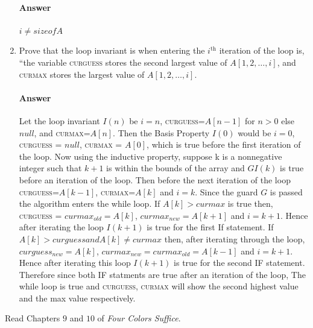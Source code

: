 \documentclass{article}
\begin{document}
\begin{enumerate}
        \paragraph{Answer}

        $i \neq size of A$

    \item Prove that the loop invariant is when entering the $i^\text{th}$
        iteration of the loop is, ``the variable \textsc{curguess} stores
        the second
        largest value of $A[1,2, \ldots, i]$,
        and \textsc{curmax} stores the largest value of $A[1,2,\ldots, i]$.

        \paragraph{Answer}

        Let the loop invariant $I(n)$ be $i=n$, \textsc{curguess}=$A[n-1]$ for $n>0$ else $null$, and \textsc{curmax}=$A[n]$. Then the Basis Property $I(0)$ would be $i=0$, \textsc{curguess = $null$, curmax = $A[0]$}, which is true before the first iteration of the loop. Now using the inductive property, suppose k is a nonnegative integer such that $k+1$ is within the bounds of the array and $G I(k)$ is true before an iteration of the loop. Then before the next iteration of the loop  \textsc{curguess=$A[k-1]$, curmax=$A[k]$} and $i=k$. Since the guard $G$ is passed the algorithm enters the while loop. If $A[k] > curmax$ is true then, \textsc{curguess = $curmax_{old} = A[k]$, $curmax_{new} = A[k+1]$} and $i=k+1$. Hence after iterating the loop $I(k+1)$ is true for the first If statement. If $A[k]> curguess and A[k] \neq curmax$ then, after iterating through the loop, \textsc{$curguess_{new} = A[k]$, $curmax_{new}=curmax_{old}=A[k-1]$} and $i=k+1$. Hence after iterating this loop $I(k+1)$ is true for the second IF statement. Therefore since both IF statments are true after an iteration of the loop, The while loop is true and \textsc{curguess, curmax} will show the second highest value and the max value respectively.

\end{enumerate}



 

Read Chapters $9$ and $10$ of \emph{Four Colors Suffice}.
\end{document}

